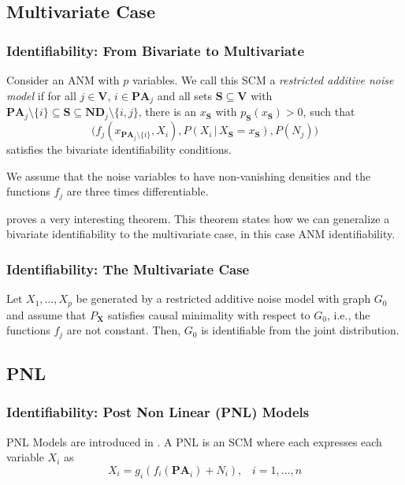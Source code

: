 \documentclass{beamer}
\newcommand{\B}[1]{\mathbf{#1}}
\newcommand{\PA}[2][]{{\B{PA}}^{#1}_{#2}}
\newcommand{\ND}[2][]{{\B{ND}}^{#1}_{#2}}
\newcommand{\given}{\,|\,}
\begin{document}
\subsection{Multivariate Case}
\begin{frame}
\frametitle{Identifiability: From Bivariate to Multivariate}
\begin{definition} \label{def:wnn}
	Consider an ANM with $p$ variables. We call this SCM a \emph{restricted additive noise model} if for all $j \in \B{V}$, $i \in \PA{j}$ and all sets  $\B{S} \subseteq \B{V}$ with  $\PA{j} \setminus \{i\} \subseteq \B{S} \subseteq \ND{j} \setminus \{i,j\}$, there is an $x_{\B{S}}$ with $p_{\B{S}}(x_{\B{S}}) > 0$, such that
	\begin{equation*}
	\Big(f_j(x_{\PA{j}\setminus \{i\}}, X_i), P(X_i \given X_{\B{S}}=x_{\B{S}}), P(N_j)\Big)
	\end{equation*}
	satisfies the bivariate identifiability conditions.
	
	We assume that the noise variables to have non-vanishing densities and the functions $f_j$ are three times differentiable.
\end{definition}
\end{frame}

\begin{frame}
\cite{continous} proves a very interesting theorem. This theorem states how we can generalize a bivariate identifiability to the multivariate case, in this case ANM identifiability.
\frametitle{Identifiability: The Multivariate Case}
\begin{theorem}
	 Let $X_1, \ldots, X_p$ be generated by a restricted additive noise model with graph $G_0$ and assume that $P_\mathbf{X}$ satisfies causal minimality with respect to $G_0$, i.e., the functions $f_j$ are not constant. Then, $G_0$ is identifiable from the joint distribution.
\end{theorem}
\end{frame}
\subsection{PNL}
\begin{frame}
\frametitle{Identifiability: Post Non Linear (PNL) Models}
\begin{definition}
PNL Models are introduced in \cite{postnonlinear}. A PNL is an SCM where each expresses each variable $X_i$ as
$$X_i=g_i(f_i(\PA i) +N_i),\;\;\;  i= 1, ..., n$$
\end{definition}
\end{frame}
\end{document}
